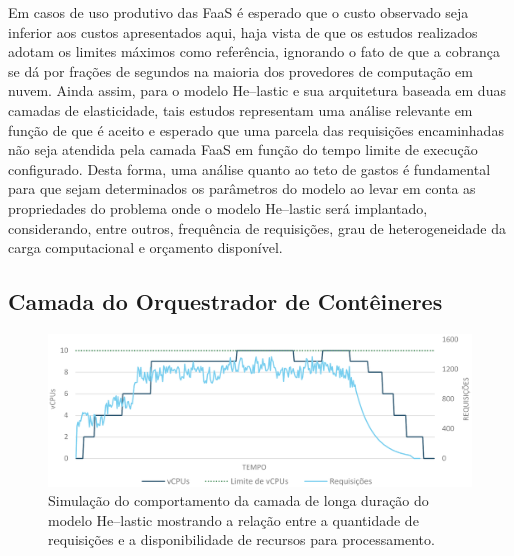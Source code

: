\documentclass[english,brazilian]{UNISINOSmonografia} %
\newcommand\defaultFigureWidth{0.9}
\begin{document}
Em casos de uso produtivo das FaaS é esperado que o custo observado seja inferior aos custos apresentados aqui, haja vista de que os estudos realizados adotam os limites máximos como referência, ignorando o fato de que a cobrança se dá por frações de segundos na maioria dos provedores de computação em nuvem.
Ainda assim, para o modelo \textsf{He}--lastic e sua arquitetura baseada em duas camadas de elasticidade, tais estudos representam uma análise relevante em função de que é aceito e esperado que uma parcela das requisições encaminhadas não seja atendida pela camada FaaS em função do tempo limite de execução configurado.
Desta forma, uma análise quanto ao teto de gastos é fundamental para que sejam determinados os parâmetros do modelo ao levar em conta as propriedades do problema onde o modelo \textsf{He}--lastic será implantado, considerando, entre outros, frequência de requisições, grau de heterogeneidade da carga computacional e orçamento disponível.






\subsection{Camada do Orquestrador de Contêineres}


\begin{figure}[tb]
	\centering%
	\begin{minipage}{\defaultFigureWidth\textwidth}
		\caption{Simulação do comportamento da camada de longa duração do modelo \textsf{He}--lastic mostrando a relação entre a quantidade de requisições e a disponibilidade de recursos para processamento.}
		\label{fig:modelo-custben-container}
		\includegraphics[width=\textwidth]{modelo-custben-container}
	\end{minipage}
\end{figure}
\end{document}
